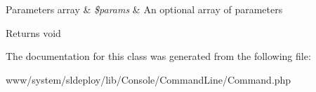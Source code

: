 \begin{DoxyParams}[1]{Parameters}
array & {\em \$params} & An optional array of parameters\\
\hline
\end{DoxyParams}
\begin{DoxyReturn}{Returns}
void 
\end{DoxyReturn}


The documentation for this class was generated from the following file:\begin{DoxyCompactItemize}
\item 
www/system/sldeploy/lib/Console/CommandLine/Command.php\end{DoxyCompactItemize}
